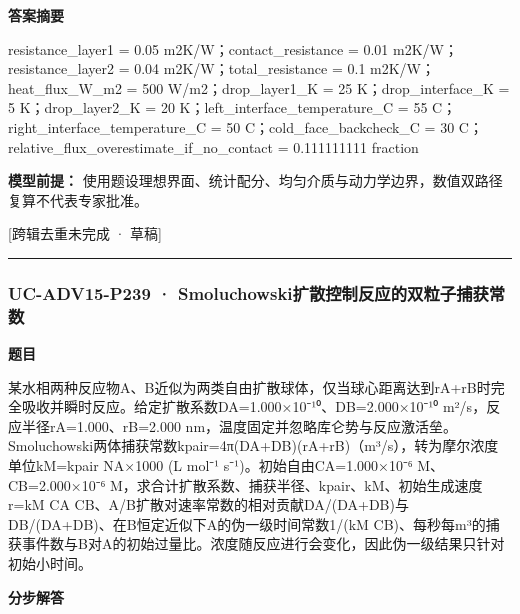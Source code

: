 \documentclass[UTF8,11pt,a4paper]{ctexart}
\begin{document}
\noindent\textbf{答案摘要}\par
resistance\_layer1 = 0.05 m2K/W；contact\_resistance = 0.01 m2K/W；resistance\_layer2 = 0.04 m2K/W；total\_resistance = 0.1 m2K/W；heat\_flux\_W\_m2 = 500 W/m2；drop\_layer1\_K = 25 K；drop\_interface\_K = 5 K；drop\_layer2\_K = 20 K；left\_interface\_temperature\_C = 55 C；right\_interface\_temperature\_C = 50 C；cold\_face\_backcheck\_C = 30 C；relative\_flux\_overestimate\_if\_no\_contact = 0.111111111 fraction\par
\noindent\textbf{模型前提：}
使用题设理想界面、统计配分、均匀介质与动力学边界，数值双路径复算不代表专家批准。\par
\noindent\textcolor{red!65!black}{[跨辑去重未完成 · 草稿]} \par
\medskip\hrule\medskip
{}
\subsubsection*{UC-ADV15-P239 · Smoluchowski扩散控制反应的双粒子捕获常数}
\noindent\textbf{题目}\par
某水相两种反应物A、B近似为两类自由扩散球体，仅当球心距离达到rA+rB时完全吸收并瞬时反应。给定扩散系数DA=1.000×10⁻¹⁰、DB=2.000×10⁻¹⁰ m²/s，反应半径rA=1.000、rB=2.000 nm，温度固定并忽略库仑势与反应激活垒。Smoluchowski两体捕获常数kpair=4π(DA+DB)(rA+rB)（m³/s），转为摩尔浓度单位kM=kpair NA×1000 (L mol⁻¹ s⁻¹)。初始自由CA=1.000×10⁻⁶ M、CB=2.000×10⁻⁶ M，求合计扩散系数、捕获半径、kpair、kM、初始生成速度r=kM CA CB、A/B扩散对速率常数的相对贡献DA/(DA+DB)与DB/(DA+DB)、在B恒定近似下A的伪一级时间常数1/(kM CB)、每秒每m³的捕获事件数与B对A的初始过量比。浓度随反应进行会变化，因此伪一级结果只针对初始小时间。\par
\medskip\noindent\textbf{分步解答}
\end{document}
